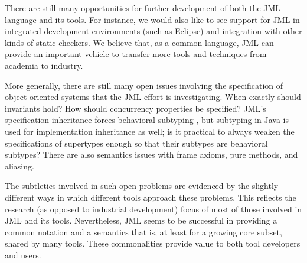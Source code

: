 
\smallskip

There are still many opportunities for further development of both the
JML language and its tools.  For instance, we would also like to see
support for JML in integrated development environments
(such as Eclipse) and integration with other kinds of static
checkers.  We believe that, as a common language, JML can provide an
important vehicle to transfer more tools and techniques from academia
to industry.


More generally, there are still many open issues involving the
specification of object-oriented systems that the JML effort is
investigating.  When exactly should 
invariants hold? %
How should concurrency properties be specified?
JML's specification inheritance forces behavioral subtyping
\cite{Dhara-Leavens96,Leavens-Baker-Ruby03}, but subtyping in
Java is used for implementation inheritance as well; is it practical
to always weaken the specifications of supertypes enough so that their
subtypes are behavioral subtypes?
There are also semantics issues with frame axioms, pure
methods, and aliasing. %

The subtleties involved in such open problems are evidenced by the slightly
different ways in which different tools approach these problems.
This reflects the research (as opposed to industrial development)
focus of most of those involved in JML and its tools.
Nevertheless, JML seems to be successful in providing a common
notation and a semantics that is, at least for a growing core subset,
shared by many tools.  These commonalities provide value
to both tool developers and users.


